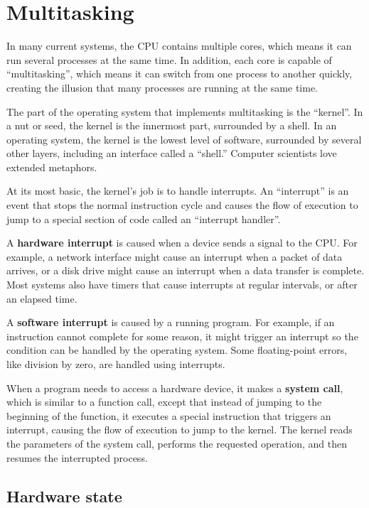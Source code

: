 \documentclass[12pt]{book}
\begin{document}
\chapter{Multitasking}

In many current systems, the CPU contains multiple cores, which means
it can run several processes at the same time.  In addition, each core
is capable of ``multitasking'', which means it can switch from one
process to another quickly, creating the illusion that many processes
are running at the same time.

The part of the operating system that implements multitasking is
the ``kernel''.  In a nut or seed, the kernel is the innermost
part, surrounded by a shell.  In an operating system, the kernel
is the lowest level of software, surrounded by several other
layers, including an interface called a ``shell.''  Computer
scientists love extended metaphors.

At its most basic, the kernel's job is to
handle interrupts.  An ``interrupt'' is an event that stops the
normal instruction cycle and causes the flow of execution to jump to a
special section of code called an ``interrupt handler''.


A {\bf hardware interrupt} is caused when a device sends a signal to the
CPU.  For example, a network interface might cause an interrupt when
a packet of data arrives, or a disk drive might cause an interrupt
when a data transfer is complete.  Most systems also have timers that
cause interrupts at regular intervals, or after an elapsed time.

A {\bf software interrupt} is caused by a running program.  For example, if
an instruction cannot complete for some reason, it might trigger an
interrupt so the condition can be handled by the operating system.
Some floating-point errors, like division by zero, are handled
using interrupts.

When a program needs to access a hardware device,
it makes a {\bf system call}, which is similar to a function call,
except that instead of jumping to the beginning of the function,
it executes a special instruction that triggers an interrupt, causing
the flow of execution to jump to the kernel.  The kernel reads the
parameters of the system call, performs the requested operation,
and then resumes the interrupted process.


\section{Hardware state}
\end{document}
